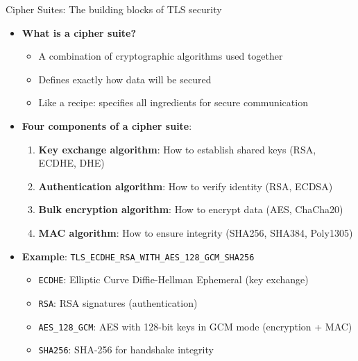 \documentclass[aspectratio=169, lualatex, handout]{beamer}
\begin{document}
\begin{frame}{Cipher Suites: The building blocks of TLS security}
	\begin{itemize}[<+->]
		\item \textbf{What is a cipher suite?}
		      \begin{itemize}
			      \item A combination of cryptographic algorithms used together
			      \item Defines exactly how data will be secured
			      \item Like a recipe: specifies all ingredients for secure communication
		      \end{itemize}
		\item \textbf{Four components of a cipher suite}:
		      \begin{enumerate}
			      \item \textbf{Key exchange algorithm}: How to establish shared keys (RSA, ECDHE, DHE)
			      \item \textbf{Authentication algorithm}: How to verify identity (RSA, ECDSA)
			      \item \textbf{Bulk encryption algorithm}: How to encrypt data (AES, ChaCha20)
			      \item \textbf{MAC algorithm}: How to ensure integrity (SHA256, SHA384, Poly1305)
		      \end{enumerate}
		\item \textbf{Example}: \texttt{TLS\_ECDHE\_RSA\_WITH\_AES\_128\_GCM\_SHA256}
		      \begin{itemize}
			      \item \texttt{ECDHE}: Elliptic Curve Diffie-Hellman Ephemeral (key exchange)
			      \item \texttt{RSA}: RSA signatures (authentication)
			      \item \texttt{AES\_128\_GCM}: AES with 128-bit keys in GCM mode (encryption + MAC)
			      \item \texttt{SHA256}: SHA-256 for handshake integrity
		      \end{itemize}
	\end{itemize}
\end{frame}
\end{document}
